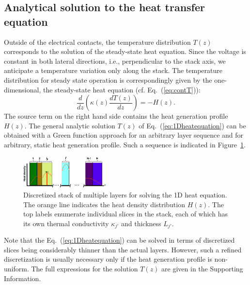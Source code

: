 \documentclass[%
9pt,
 aip,
rsi,%
 amsmath,amssymb,
preprint,%
]{revtex4-1}
\begin{document}
\subsection{Analytical solution to the heat transfer equation}
Outside of the electrical contacts, the temperature distribution $T(z)$ corresponds to the solution of the steady-state heat equation. 
Since the voltage is constant in both lateral directions, i.e., perpendicular to the stack axis, we anticipate a temperature variation only along the stack. The temperature distribution for steady state operation is correspondingly given by the one-dimensional, the steady-state heat equation (cf. Eq.~(\ref{eq:contT})):
\begin{equation}
	\label{eq:1Dheatequation}
    \frac{d}{dz}\left(\kappa(z) \frac{dT(z)}{dz}\right) = -H(z).
\end{equation}
The source term on the right hand side contains the heat generation profile $H(z)$.
The general analytic solution $T(z)$ of Eq.~(\ref{eq:1Dheatequation}) can be obtained with a Green function approach for an arbitrary layer sequence and for arbitrary, static heat generation profile. 
Such a sequence is indicated in Figure~\ref{fig:MultiLayersSetup}.
\begin{figure}
	\centering
	\includegraphics[width=0.4\textwidth]{General_plots_3.eps}
	\caption{Discretized stack of multiple layers for solving the 1D heat equation. The orange line indicates the heat density distribution $H(z)$. The top labels enumerate individual slices in the stack, each of which has its own thermal conductivity $\kappa_{j'}$ and thickness $L_{j'}$. }
	\label{fig:MultiLayersSetup}
\end{figure}
Note that the Eq.~(\ref{eq:1Dheatequation}) can be solved in terms of discretized slices being considerably thinner than the actual layers. However, such a refined discretization is usually necessary only if the heat generation profile is non-uniform.
The full expressions for the solution $T(z)$ are given in the Supporting Information. 
\end{document}
